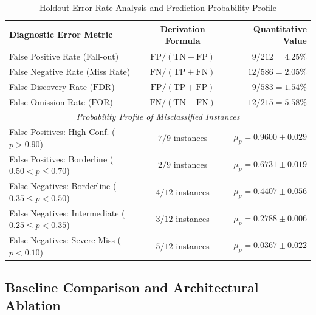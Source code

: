 \documentclass[conference]{IEEEtran}
\begin{document}
\begin{table}[t]
  \centering
  \caption{Holdout Error Rate Analysis and Prediction Probability Profile}
  \label{tab:error_breakdown}
  \begin{tabular}{lcr}
    \toprule
    \textbf{Diagnostic Error Metric} & \textbf{Derivation Formula} & \textbf{Quantitative Value} \\
    \midrule
    False Positive Rate (Fall-out)    & $\text{FP} / (\text{TN} + \text{FP})$ & $9 / 212 = \mathbf{4.25\%}$ \\
    False Negative Rate (Miss Rate)   & $\text{FN} / (\text{TP} + \text{FN})$ & $12 / 586 = \mathbf{2.05\%}$ \\
    False Discovery Rate ($\text{FDR}$) & $\text{FP} / (\text{TP} + \text{FP})$ & $9 / 583 = \mathbf{1.54\%}$ \\
    False Omission Rate ($\text{FOR}$)  & $\text{FN} / (\text{TN} + \text{FN})$ & $12 / 215 = \mathbf{5.58\%}$ \\
    \midrule
    \multicolumn{3}{c}{\textit{Probability Profile of Misclassified Instances}} \\
    \midrule
    False Positives: High Conf. ($p > 0.90$)   & $7 / 9$ instances  & $\mu_p = 0.9600 \pm 0.029$ \\
    False Positives: Borderline ($0.50 < p \le 0.70$) & $2 / 9$ instances  & $\mu_p = 0.6731 \pm 0.019$ \\
    \midrule
    False Negatives: Borderline ($0.35 \le p < 0.50$) & $4 / 12$ instances & $\mu_p = 0.4407 \pm 0.056$ \\
    False Negatives: Intermediate ($0.25 \le p < 0.35$)& $3 / 12$ instances & $\mu_p = 0.2788 \pm 0.006$ \\
    False Negatives: Severe Miss ($p < 0.10$)   & $5 / 12$ instances & $\mu_p = 0.0367 \pm 0.022$ \\
    \bottomrule
  \end{tabular}
\end{table}

\subsection{Baseline Comparison and Architectural Ablation}
\label{sec:baseline_ablation}
\end{document}
